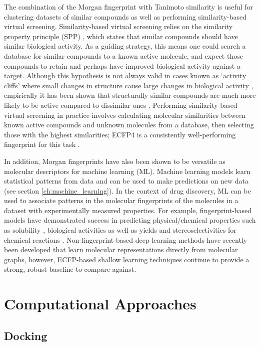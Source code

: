 The combination of the Morgan fingerprint with Tanimoto similarity is useful for clustering \cite{Butina1999Clustering} datasets of similar compounds as well as performing similarity-based virtual screening. Similarity-based virtual screening relies on the similarity property principle (SPP) \cite{johnson1990concepts}, which states that similar compounds should have similar biological activity. As a guiding strategy, this means one could search a database for similar compounds to a known active molecule, and expect those compounds to retain and perhaps have improved biological activity against a target. Although this hypothesis is not always valid in cases known as `activity cliffs' where small changes in structure cause large changes in biological activity \cite{maggiora2006cliffs}, empirically it has been shown that structurally similar compounds are much more likely to be active compared to dissimilar ones \cite{martin2002similar}. Performing similarity-based virtual screening in practice involves calculating molecular similarities between known active compounds and unknown molecules from a database, then selecting those with the highest similarities; ECFP4 is a consistently well-performing fingerprint for this task \cite{riniker2013benchmark, oboyle2016benchmark}.

In addition, Morgan fingerprints have also been shown to be versatile as molecular descriptors for machine learning (ML). Machine learning models learn statistical patterns from data and can be used to make predictions on new data (see section \ref{ch:machine_learning}). In the context of drug discovery, ML can be used to associate patterns in the molecular fingerprints of the molecules in a dataset with experimentally measured properties. For example, fingerprint-based models have demonstrated success in predicting physical/chemical properties such as solubility \cite{wu2017molnet}, biological activities \cite{Bender2019} as well as yields and stereoselectivities for chemical reactions \cite{sandfort2020yield}. Non-fingerprint-based deep learning methods have recently been developed that learn molecular representations directly from molecular graphs, however, ECFP-based shallow learning techniques continue to provide a strong, robust baseline to compare against.

\section{Computational Approaches}

\subsection{Docking}

